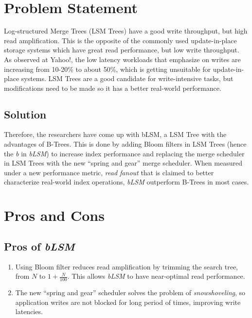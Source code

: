\documentclass{article}
\title{\mytitle}
\author{\myname}
\date{\today}
\theoremstyle{plain}
\begin{document}
\maketitle
\section{Problem Statement}

\cite{10.1145/2213836.2213862} Log-structured Merge Trees (LSM Trees) have a good write throughput, but high
read amplification. This is the opposite of the commonly used update-in-place
storage systems which have great read performance, but low write throughput. As
observed at Yahoo!, the low latency workloads that emphasize on writes are
increasing from 10-20\% to about 50\%, which is getting unsuitable for
update-in-place systems. LSM Trees are a good candidate for write-intensive
tasks, but modifications need to be made so it has a better real-world
performance.

\subsection{Solution}
Therefore, the researchers have come up with bLSM, a LSM Tree with the
advantages of B-Trees. This is done by adding Bloom filters in LSM Trees (hence
the \emph{b} in \emph{bLSM}) to increase index performance and replacing the
merge scheduler in LSM Trees with the new ``spring and gear'' merge scheduler.
When measured under a new performance metric, \emph{read fanout} that is claimed
to better characterize real-world index operations, \emph{bLSM} outperform
B-Trees in most cases.

\section{Pros and Cons}
\subsection{Pros of \emph{bLSM}}
\begin{enumerate}
\item Using Bloom filter reduces read amplification by trimming the search tree,
from $N$ to $1 + \frac{N}{100}$. This allows \emph{bLSM} to have near-optimal
read performance.
\item The new ``spring and gear'' scheduler solves the problem of
\emph{snowshoveling}, so application writes are not blocked for long period of
times, improving write latencies.
\end{enumerate}
\end{document}
